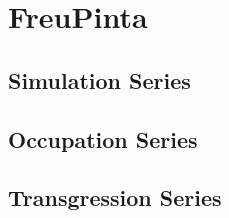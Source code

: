 \chapter{FreuPinta}

\section{Simulation Series}
\section{Occupation Series}
\section{Transgression Series}

\label{ch:freupinta}
